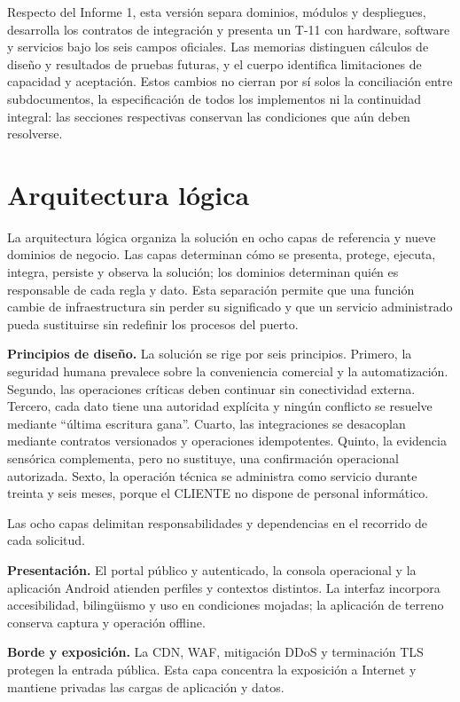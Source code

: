 Respecto del Informe 1, esta versión separa dominios, módulos y despliegues, desarrolla los contratos de integración y presenta un T-11 con hardware, software y servicios bajo los seis campos oficiales. Las memorias distinguen cálculos de diseño y resultados de pruebas futuras, y el cuerpo identifica limitaciones de capacidad y aceptación. Estos cambios no cierran por sí solos la conciliación entre subdocumentos, la especificación de todos los implementos ni la continuidad integral: las secciones respectivas conservan las condiciones que aún deben resolverse.

\section{Arquitectura lógica}

La arquitectura lógica organiza la solución en ocho capas de referencia y nueve dominios de negocio. Las capas determinan cómo se presenta, protege, ejecuta, integra, persiste y observa la solución; los dominios determinan quién es responsable de cada regla y dato. Esta separación permite que una función cambie de infraestructura sin perder su significado y que un servicio administrado pueda sustituirse sin redefinir los procesos del puerto.

\textbf{Principios de diseño.} La solución se rige por seis principios. Primero, la seguridad humana prevalece sobre la conveniencia comercial y la automatización. Segundo, las operaciones críticas deben continuar sin conectividad externa. Tercero, cada dato tiene una autoridad explícita y ningún conflicto se resuelve mediante “última escritura gana”. Cuarto, las integraciones se desacoplan mediante contratos versionados y operaciones idempotentes. Quinto, la evidencia sensórica complementa, pero no sustituye, una confirmación operacional autorizada. Sexto, la operación técnica se administra como servicio durante treinta y seis meses, porque el CLIENTE no dispone de personal informático.

Las ocho capas delimitan responsabilidades y dependencias en el recorrido de cada solicitud.

\textbf{Presentación.} El portal público y autenticado, la consola operacional y la aplicación Android atienden perfiles y contextos distintos. La interfaz incorpora accesibilidad, bilingüismo y uso en condiciones mojadas; la aplicación de terreno conserva captura y operación offline.

\textbf{Borde y exposición.} La CDN, WAF, mitigación DDoS y terminación TLS protegen la entrada pública. Esta capa concentra la exposición a Internet y mantiene privadas las cargas de aplicación y datos.

